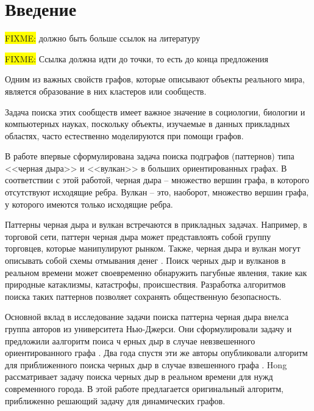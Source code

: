 \documentclass[12pt,a4paper,oneside,openany]{article}
\newcommand{\FIXME}[1]{ %
	\colorbox{yellow}{FIXME:} #1
}
\theoremstyle{definition}
\theoremstyle{lemma}
\theoremstyle{remark}
\begin{document}
\setcounter{page}{2}

\tableofcontents
{}

\cleardoublepage
\section{Введение}\label{sec:otherintro}
\FIXME{должно быть больше ссылок на литературу}

\FIXME{Ссылка должна идти до точки, то есть до конца предложения}


Одним из важных свойств графов, которые описывают объекты реального мира,
является образование в них кластеров или сообществ.

Задача поиска этих сообществ имеет важное значение в социологии, биологии и компьютерных науках,
поскольку объекты, изучаемые в данных прикладных областях, часто естественно моделируются при
помощи графов. \cite{fortunato2010community}

В работе \cite{li2010detecting} впервые сформулирована задача поиска подграфов (паттернов) типа <<черная дыра>> и <<вулкан>> в больших ориентированных графах. В соответствии с этой работой, черная дыра -- множество вершин графа, в которого отсутствуют исходящие ребра. Вулкан -- это, наоборот, множество вершин графа, у которого имеются только исходящие ребра.

Паттерны черная дыра и вулкан встречаются в прикладных задачах. Например, в торговой сети, паттерн черная дыра может представлоять собой группу торговцев, которые манипулируют рынком. Также, черная дыра и вулкан могут описывать собой схемы отмывания денег \cite{semenov2017survey}. Поиск черных дыр и вулканов в реальном времени может  своевременно обнаружить пагубные явления, такие как природные катаклизмы, катастрофы, происшествия. Разработка алгоритмов поиска таких паттернов позволяет сохранять общественную безопасность. \cite{hong2015detecting}

Основной вклад в исследование задачи поиска паттерна черная дыра внелса группа авторов из университета Нью-Джерси. Они сформулировали задачу и предложили аалгоритм поиса ч ерных дыр в случае невзвешенного ориентированного графа \cite{li2010detecting}. Два  года спустя эти же авторы опубликовали алгоритм для приближенного поиска черных дыр в случае взвешенного графа \cite{li2012mining,li2014mining}. Hong \cite{hong2015detecting} рассматривает задачу поиска черных дыр в реальном времени для  нужд современного города. В этой работе предлагается оригинальный алгоритм, приближенно решающий задачу для динамических графов.
\end{document}
